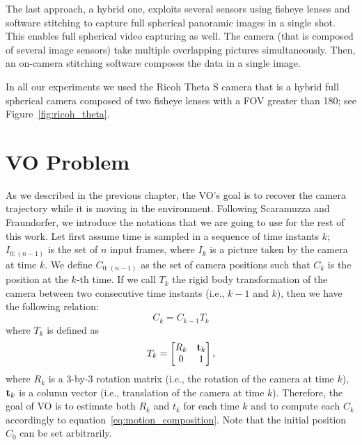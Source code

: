 The last approach, a hybrid one, exploits several sensors using fisheye lenses and software stitching to capture full spherical panoramic images in a single shot. This enables full spherical video capturing as well. The camera (that is composed of several image sensors) take multiple overlapping pictures simultaneously. Then, an on-camera stitching software composes the data in a single image.

In all our experiments we used the Ricoh Theta S camera that is a hybrid full spherical camera composed of two fisheye lenses with a FOV greater than 180\degree; see Figure~\ref{fig:ricoh_theta}.
%
%

\section{VO Problem}
\label{sec:vo_problem}
As we described in the previous chapter, the VO's goal is to recover the 
camera trajectory while it is moving in the environment. Following Scaramuzza and Fraundorfer\cite{scaramuzzaVisualOdometryI},
we introduce the notations that we are going to use for the rest of this work.
%
Let first assume time is sampled in a sequence of time instants \(k\); 
\(I_{0:(n - 1)} \) is the set of $n$ input frames, where \(I_{k}\) is a picture taken by 
the camera at time \(k\). We define \(C_{0:(n-1)}\) as the set of camera 
positions such that \(C_k\) is the position at the \(k\)-th time.
If we call \(T_k\) the rigid body transformation of the camera between two
consecutive time instants (i.e., $k-1$ and $k$), then we have the following relation:
%
\begin{equation}
	C_k = C_{k-1} T_k
	\label{eq:motion_composition}
\end{equation}
%
\noindent where \(T_k\) is defined as
%
\begin{equation*}
	T_k =
	\begin{bmatrix}
	R_k & \mathbf{t}_k \\
	0 & 1
	\end{bmatrix} \text{,}
\end{equation*}
%
\noindent where $R_k$ is a 3-by-3 rotation matrix (i.e., the rotation of the camera at time $k$),
$\mathbf{t}_k$ is a column vector (i.e., translation of the camera at time $k$).
Therefore, the goal of VO is to estimate both $R_k$ and $t_k$ for each time 
$k$ and to compute each $C_k$ accordingly to equation~\ref{eq:motion_composition}. Note that the initial position $C_0$ can be set arbitrarily.

